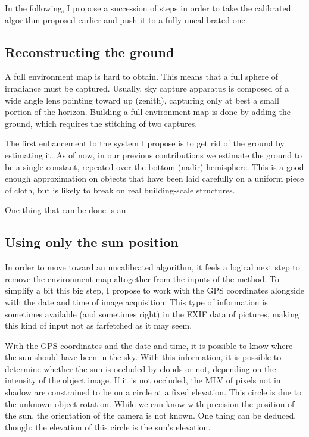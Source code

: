 In the following, I propose a succession of steps in order to take the calibrated algorithm proposed earlier and push it to a fully uncalibrated one.


\subsection{Reconstructing the ground}
A full environment map is hard to obtain. This means that a full sphere of irradiance must be captured. Usually, sky capture apparatus is composed of a wide angle lens pointing toward up (zenith), capturing only at best a small portion of the horizon. Building a full environment map is done by adding the ground, which requires the stitching of two captures.

The first enhancement to the system I propose is to get rid of the ground by estimating it. As of now, in our previous contributions we estimate the ground to be a single constant, repeated over the bottom (nadir) hemisphere. This is a good enough approximation on objects that have been laid carefully on a uniform piece of cloth, but is likely to break on real building-scale structures.

One thing that can be done is an 


\subsection{Using only the sun position}
In order to move toward an uncalibrated algorithm, it feels a logical next step to remove the environment map altogether from the inputs of the method. To simplify a bit this big step, I propose to work with the GPS coordinates alongside with the date and time of image acquisition. This type of information is sometimes available (and sometimes right) in the EXIF data of pictures, making this kind of input not as farfetched as it may seem.

With the GPS coordinates and the date and time, it is possible to know where the sun should have been in the sky. With this information, it is possible to determine whether the sun is occluded by clouds or not, depending on the intensity of the object image. If it is not occluded, the MLV of pixels not in shadow are constrained to be on a circle at a fixed elevation. This circle is due to the unknown object rotation. While we can know with precision the position of the sun, the orientation of the camera is not known. One thing can be deduced, though: the elevation of this circle is the sun's elevation.

